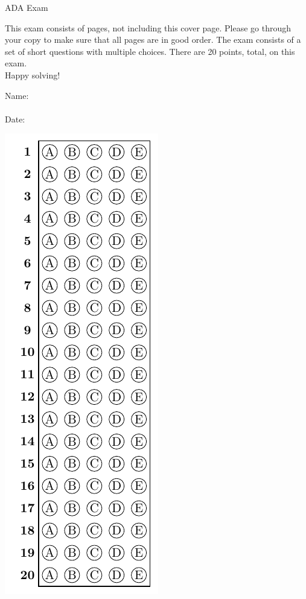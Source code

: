 \documentclass[11pt, answers, addpoints]{exam}
\begin{document}
	
	\begin{coverpages}
		\begin{center}
			\begin{Large}
				\vspace{-5mm}
				ADA Exam
			\end{Large}
		\end{center}
		\vspace{5mm}

		\begin{MyBox}
			This exam consists of \numpages{} pages, not including this cover page.  Please go through your copy to make sure that all pages are in good order.  The exam consists of a set of short questions with multiple choices. There are 20 points, total, on this exam. \\
			Happy solving!
		\end{MyBox}

		\vspace{10mm}
		\noindent
		Name:\enspace\hrulefill \\
		\\
		Date:\enspace\hrulefill
		\vspace{5mm}
		\begin{center}
			\includegraphics{../answer_table}


\end{center}
\end{coverpages}
\end{document}
